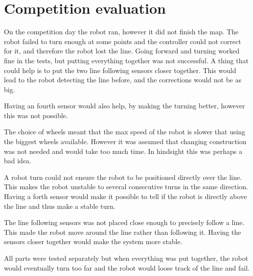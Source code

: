 \section{Competition evaluation}
On the competition day the robot ran, however it did not finish the map.
The robot failed to turn enough at some points and the controller could not correct for it, and therefore the robot lost the line.
Going forward and turning worked fine in the tests, but putting everything together was not successful.
A thing that could help is to put the two line following sensors closer together.
This would lead to the robot detecting the line before, and the corrections would not be as big. 

Having an fourth sensor would also help, by making the turning better, however this was not possible.

The choice of wheels meant that the max speed of the robot is slower that using the biggest wheels available.
However it was assumed that changing construction was not needed and would take too much time.
In hindsight this was perhaps a bad idea.


A robot turn could not ensure the robot to be positioned directly over the line.
This makes the robot unstable to several consecutive turns in the same direction.
Having a forth sensor would make it possible to tell if the robot is directly above the line and thus make a stable turn.

The line following sensors was not placed close enough to precisely follow a line.
This made the robot move around the line rather than following it.
Having the sensors closer together would make the system more stable. 

All parts were tested separately but when everything was put together, the robot would eventually turn too far and the robot would loose track of the line and fail.
